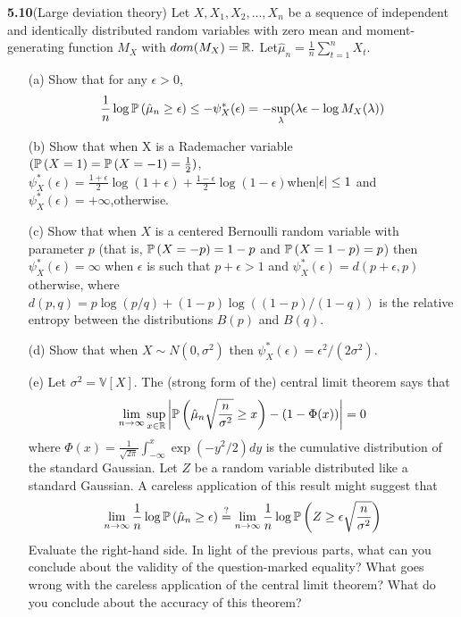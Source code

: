 \noindent\textbf{5.10}(Large deviation theory) Let $X,X_1,X_2,...,X_n$ be a sequence of independent and identically distributed random variables with zero mean and moment-generating function $M_X$ with $dom(M_X)=\mathbb{R}.$ Let$\hat{\mu}_n=\frac{1}{n}\sum_{t=1}^nX_t$.
\begin{enumerate}
    \item[(a)]Show that for any $\epsilon>0$,
        \begin{align}
            \frac{1}{n}\log\mathbb{P} \left(\hat{\mu}_n\geq\epsilon\right)\leq -\psi_X^{\ast}(\epsilon)=-\underset{\lambda}{\sup}(\lambda\epsilon-\log M_X(\lambda))
        \end{align}
    \item[(b)]Show that when X is a Rademacher variable$(\mathbb{P} \left(X=1\right)=\mathbb{P} \left(X=-1\right)=\frac{1}{2})$,$\psi_X^{\ast}(\epsilon)=\frac{1+\epsilon}{2}\log(1+\epsilon)+\frac{1-\epsilon}{2}\log(1-\epsilon)$when$\left| \epsilon \right|\le 1$ and $\psi_X^{\ast}(\epsilon)=+\infty$,otherwise.
    \item[(c)] Show that when $X$ is a centered Bernoulli random variable with parameter $p$ (that is, $\mathbb{P} \left(X = -p\right)=1-p$ and  $\mathbb{P} \left(X = 1-p\right)=p$) then $\psi_X^{\ast}(\epsilon)=\infty$ when $\epsilon$ is such that $p+\epsilon>1$ and $\psi_X^{\ast}(\epsilon)=d(p+\epsilon,p)$ otherwise, where $d(p,q) = p\log(p/q) + (1-p) \log((1-p)/(1-q))$ is the relative entropy between the distributions $B(p)$ and $B(q)$.
    \item[(d)] Show that when $X\sim N(0,\sigma^2)$ then $\psi_X^{\ast}(\epsilon)=\epsilon^2/(2\sigma^2)$.
    \item[(e)] Let $\sigma^2=\mathbb{V}[X]$. The (strong form of the) central limit theorem says that
    \begin{align*}
        \lim_{n\to\infty} \sup_{x\in\mathbb{R}} \left| \mathbb{P} \left(\hat{\mu}_n\sqrt{\frac{n}{\sigma^2}}\geq x\right)-(1-\Phi(x)) \right|=0
    \end{align*}
    where $\Phi(x)=\frac{1}{\sqrt{2\pi}}\int_{-\infty}^x \exp(-y^2/2) dy$ is the cumulative distribution of the standard Gaussian. Let $Z$ be a random variable distributed like a standard Gaussian. A careless application of this result might suggest that 
    \begin{align*}
        \lim_{n\to\infty}\frac{1}{n}\log\mathbb{P} \left(\hat{\mu}_n\geq \epsilon\right)\overset{?}{=}\lim_{n\to\infty}\frac{1}{n}\log\mathbb{P} \left(Z\geq \epsilon\sqrt{\frac{n}{\sigma^2}}\right)
    \end{align*}
    Evaluate the right-hand side. In light of the previous parts, what can you conclude about the validity of the question-marked equality? What goes wrong with the careless application of the central limit theorem? What do you conclude about the accuracy of this theorem?
\end{enumerate}

